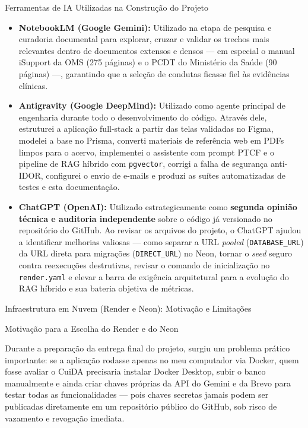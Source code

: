 \documentclass[11pt,a4paper]{article}
\newcommand{\tituloSecao}[1]{%
  \par\addvspace{12pt}%
  {\noindent\fontsize{20pt}{24pt}\selectfont\normalfont\color{headingBlue}#1\par}%
  \vspace{4pt}%
}
\newcommand{\subtituloSecao}[1]{%
  \par\addvspace{10pt}%
  {\noindent\fontsize{16pt}{20pt}\selectfont\normalfont\color{headingBlue}#1\par}%
  \vspace{3pt}%
}
\begin{document}
\subtituloSecao{Ferramentas de IA Utilizadas na Construção do Projeto}

\begin{itemize}[leftmargin=1.25cm, label=\textbullet, topsep=2pt, itemsep=6pt]
  \item \textbf{NotebookLM (Google Gemini):} Utilizado na etapa de pesquisa e curadoria documental para explorar, cruzar e validar os trechos mais relevantes dentro de documentos extensos e densos — em especial o manual iSupport da OMS (275 páginas) e o PCDT do Ministério da Saúde (90 páginas) —, garantindo que a seleção de condutas ficasse fiel às evidências clínicas.
  \item \textbf{Antigravity (Google DeepMind):} Utilizado como agente principal de engenharia durante todo o desenvolvimento do código. Através dele, estruturei a aplicação full-stack a partir das telas validadas no Figma, modelei a base no Prisma, converti materiais de referência web em PDFs limpos para o acervo, implementei o assistente com prompt PTCF e o pipeline de RAG híbrido com \texttt{pgvector}, corrigi a falha de segurança anti-IDOR, configurei o envio de e-mails e produzi as suítes automatizadas de testes e esta documentação.
  \item \textbf{ChatGPT (OpenAI):} Utilizado estrategicamente como \textbf{segunda opinião técnica e auditoria independente} sobre o código já versionado no repositório do GitHub. Ao revisar os arquivos do projeto, o ChatGPT ajudou a identificar melhorias valiosas — como separar a URL \textit{pooled} (\texttt{DATABASE\_URL}) da URL direta para migrações (\texttt{DIRECT\_URL}) no Neon, tornar o \textit{seed} seguro contra reexecuções destrutivas, revisar o comando de inicialização no \texttt{render.yaml} e elevar a barra de exigência arquitetural para a evolução do RAG híbrido e sua bateria objetiva de métricas.
\end{itemize}

\tituloSecao{Infraestrutura em Nuvem (Render e Neon): Motivação e Limitações}

\subtituloSecao{Motivação para a Escolha do Render e do Neon}

Durante a preparação da entrega final do projeto, surgiu um problema prático importante: se a aplicação rodasse apenas no meu computador via Docker, quem fosse avaliar o CuiDA precisaria instalar Docker Desktop, subir o banco manualmente e ainda criar chaves próprias da API do Gemini e da Brevo para testar todas as funcionalidades — pois chaves secretas jamais podem ser publicadas diretamente em um repositório público do GitHub, sob risco de vazamento e revogação imediata.
\end{document}

